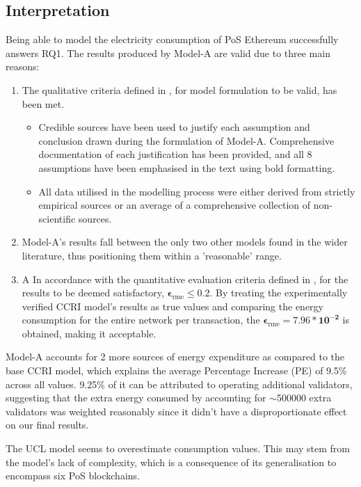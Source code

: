 \subsection{Interpretation}

Being able to model the electricity consumption of PoS Ethereum successfully answers RQ1. The results produced by Model-A are valid due to three main reasons:
\begin{enumerate}
    \item The qualitative criteria defined in , for model formulation to be valid, has been met. 
    \begin{itemize}
        \item Credible sources have been used to justify each assumption and conclusion drawn during the formulation of Model-A. Comprehensive documentation of each justification has been provided, and all 8 assumptions have been emphasised in the text using bold formatting.
        \item All data utilised in the modelling process were either derived from strictly empirical sources or an average of a comprehensive collection of non-scientific sources.
    \end{itemize}
    \item Model-A's results fall between the only two other models found in the wider literature, thus positioning them within a 'reasonable' range.
    \item A In accordance with the quantitative evaluation criteria defined in , for the results to be deemed satisfactory, $\boldsymbol{\epsilon_\mathrm{rme} \leq 0.2}$. By treating the experimentally verified CCRI model's results as true values and comparing the energy consumption for the entire network per transaction, the $\boldsymbol{\epsilon_\mathrm{rme} = 7.96 * 10^{-2}}$ is obtained, making it acceptable.   
\end{enumerate}

Model-A accounts for 2 more sources of energy expenditure as compared to the base CCRI model, which explains the average Percentage Increase (PE) of 9.5\% across all values. 9.25\% of it can be attributed to operating additional validators, suggesting that the extra energy consumed by accounting for $\sim$500000 extra validators was weighted reasonably since it didn't have a disproportionate effect on our final results. 

The UCL model seems to overestimate consumption values. This may stem from the model's lack of complexity, which is a consequence of its generalisation to encompass six PoS blockchains.

